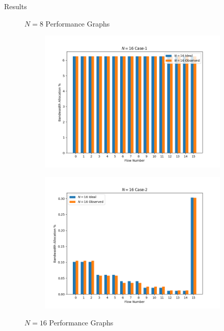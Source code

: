 \begin{section}{Results}
\begin{figure}[h]
\begin{subfigure}[b]{0.45\textwidth}
        \label{fig:image2}
    \end{subfigure}
    \caption{$N=8$ Performance Graphs}
    \label{fig:two_images}
\end{figure}


\begin{figure}[h] %
    \centering
    \begin{subfigure}[b]{0.46\textwidth}
        \centering
        \includegraphics[width=\textwidth]{figures/fig1/N=16_1.png} %
        \label{fig:image1}
    \end{subfigure}
    \hfill
    \begin{subfigure}[b]{0.46\textwidth}
        \centering
        \includegraphics[width=\textwidth]{figures/fig1/N=16_2.png} %
        \label{fig:image2}
    \end{subfigure}
    \caption{$N=16$ Performance Graphs}
    \label{fig:two_images}
\end{figure}
\end{section}

